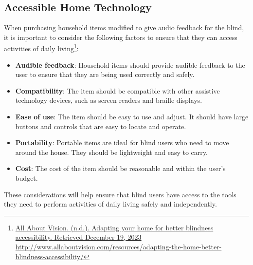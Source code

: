 \documentclass[12pt,letterpaper,twoside]{extreport}
\begin{document}
\hypertarget{ind-living-tools}{}\subsection{Accessible Home Technology}\label{ind-living-tools}
When purchasing household items modified to give audio feedback for the blind, it is important to consider the following factors to ensure that they can access activities of daily living\footnote{\raggedright \href{http://www.allaboutvision.com/resources/adapting-the-home-better-blindness-accessibility/}{All About Vision. (n.d.). Adapting your home for better blindness accessibility. Retrieved December 19, 2023} \url{http://www.allaboutvision.com/resources/adapting-the-home-better-blindness-accessibility/}}:
\begin{itemize}[leftmargin=*]
\item \textbf{Audible feedback}: Household items should provide audible feedback to the user to ensure that they are being used correctly and safely.
\item \textbf{Compatibility}: The item should be compatible with other assistive technology devices, such as screen readers and braille displays.
\item \textbf{Ease of use}: The item should be easy to use and adjust. It should have large buttons and controls that are easy to locate and operate.
\item \textbf{Portability}: Portable items are ideal for blind users who need to move around the house. They should be lightweight and easy to carry.
\item \textbf{Cost}: The cost of the item should be reasonable and within the user’s budget.
\end{itemize}
These considerations will help ensure that blind users have access to the tools they need to perform activities of daily living safely and independently.
\end{document}
